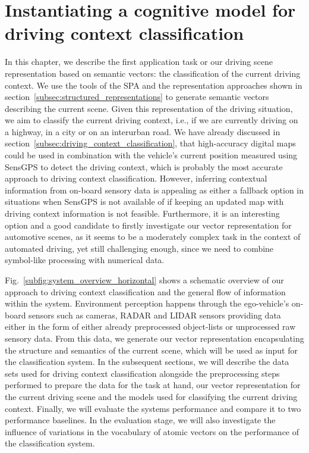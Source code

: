 \chapter{Instantiating a cognitive model for driving context classification}
\label{chap:driving_context_classification}

In this chapter, we describe the first application task or our driving scene representation based on semantic vectors: the classification of the current driving context.
We use the tools of the \ac{SPA} and the representation approaches shown in section~\ref{subsec:structured_representations} to generate semantic vectors describing the current scene.
Given this representation of the driving situation, we aim to classify the current driving context, i.e., if we are currently driving on a highway, in a city or on an interurban road.
We have already discussed in section~\ref{subsec:driving_context_classification}, that high-accuracy digital maps could be used in combination with the vehicle's current position measured using \ac{SensGPS} to detect the driving context, which is probably the most accurate approach to driving context classification.
However, inferring contextual information from on-board sensory data is appealing as either a fallback option in situations when \ac{SensGPS} is not available of if keeping an updated map with driving context information is not feasible.
Furthermore, it is an interesting option and a good candidate to firstly investigate our vector representation for automotive scenes, as it seems to be a moderately complex task in the context of automated driving, yet still challenging enough, since we need to combine symbol-like processing with numerical data.

Fig.~\ref{subfig:system_overview_horizontal} shows a schematic overview of our approach to driving context classification  and the general flow of information within the system.
Environment perception happens through the ego-vehicle's on-board sensors such as cameras, \ac{RADAR} and \ac{LIDAR} sensors providing data either in the form of either already preprocessed object-lists or unprocessed raw sensory data.
From this data, we generate our vector representation encapsulating the structure and semantics of the current scene, which will be used as input for the classification system.
In the subsequent sections, we will describe the data sets used for driving context classification alongside the preprocessing steps performed to prepare the data for the task at hand, our vector representation for the current driving scene and the models used for classifying the current driving context.
Finally, we will evaluate the systems performance and compare it to two performance baselines.
In the evaluation stage, we will also investigate the influence of variations in the vocabulary of atomic vectors on the performance of the classification system.

